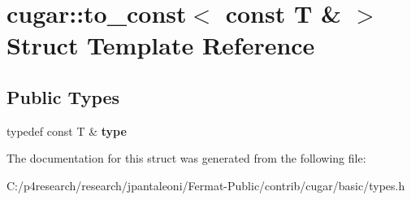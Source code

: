 \hypertarget{structcugar_1_1to__const_3_01const_01_t_01_6_01_4}{}\section{cugar\+:\+:to\+\_\+const$<$ const T \& $>$ Struct Template Reference}
\label{structcugar_1_1to__const_3_01const_01_t_01_6_01_4}
\subsection*{Public Types}
\begin{DoxyCompactItemize}
\item 
\mbox{\label{structcugar_1_1to__const_3_01const_01_t_01_6_01_4_a81675e6fb8045c95272d8d62b227472c}} 
typedef const T \& {\bfseries type}
\end{DoxyCompactItemize}


The documentation for this struct was generated from the following file\+:\begin{DoxyCompactItemize}
\item 
C\+:/p4research/research/jpantaleoni/\+Fermat-\/\+Public/contrib/cugar/basic/types.\+h\end{DoxyCompactItemize}
